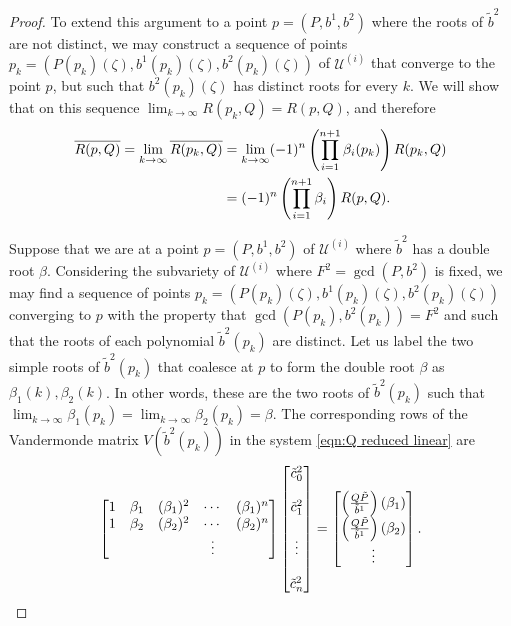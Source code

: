 \documentclass{article}
\begin{document}
\begin{lem}
\begin{proof}
To extend this argument to a point $p = (P,b^1,b^2)$ where the roots of $\tilde{b}^2$ are not distinct, we may construct a sequence of points $p_k = (P(p_k)(\zeta), b^1(p_k)(\zeta), b^2(p_k)(\zeta))$ of $\mathcal{U}^{(i)}$ that converge to the point $p$, but such that $b^2(p_k)(\zeta)$ has distinct roots for every $k$. We will show that on this sequence $\lim_{k\to\infty} R(p_k,Q) = R(p,Q)$, and therefore
\begin{align*}
\overline{R(p,Q)}
= \lim_{k\to\infty} \overline{R(p_k,Q)}
&= \lim_{k\to\infty} (-1)^{n}\left( \prod_{i=1}^{n+1}  \beta_i(p_k) \right)  R(p_k,Q) \\
&= (-1)^{n}\left( \prod_{i=1}^{n+1}  \beta_i \right) R(p,Q).
\end{align*}

Suppose that we are at a point $p = (P,b^1,b^2)$ of $\mathcal{U}^{(i)}$ where $\tilde{b}^2$ has a double root $\beta$. Considering the subvariety of $\mathcal{U}^{(i)}$ where $F^2 = \gcd(P,b^2)$ is fixed, we may find a sequence of points $p_k = (P(p_k)(\zeta), b^1(p_k)(\zeta), b^2(p_k)(\zeta))$ converging to $p$ with the property that $\gcd(P(p_k),b^2(p_k)) = F^2$ and such that the roots of each polynomial $\tilde{b}^2(p_k)$ are distinct. Let us label the two simple roots of $\tilde{b}^2(p_k)$ that coalesce at $p$ to form the double root $\beta$ as $\beta_1(k),\beta_2(k)$.
In other words, these are the two roots of $\tilde{b}^2(p_k)$ such that $\lim_{k\to\infty} \beta_1(p_k) = \lim_{k\to\infty} \beta_2(p_k) = \beta$. The corresponding rows of the Vandermonde matrix $V(\tilde{b}^2(p_k))$ in the system \eqref{eqn:Q reduced linear} are
\[
\begin{bmatrix}
1 & \beta_1 & (\beta_1)^2 & \cdots & (\beta_1)^{n} \\
1 & \beta_2 & (\beta_2)^2 & \cdots & (\beta_2)^{n} \\
&&&\vdots&
\end{bmatrix}
\begin{bmatrix}
\tilde{c}^2_0 \\~\\ \tilde{c}^2_1 \\~\\ \vdots \\~\\ \tilde{c}^2_n
\end{bmatrix}
=
\begin{bmatrix}
\left(\frac{Q\tilde{P}}{\tilde{b}^1}\right)(\beta_1) \\
\left(\frac{Q\tilde{P}}{\tilde{b}^1}\right)(\beta_2) \\
\vdots
\end{bmatrix}.
\]
\end{proof}
\end{lem}
\end{document}
